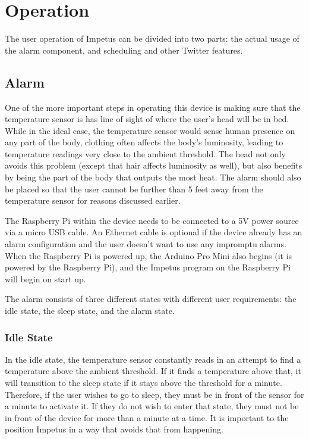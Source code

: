 \chapter{Operation}
The user operation of Impetus can be divided into two parts: the
actual usage of the alarm component, and scheduling and other Twitter
features.

\section{Alarm}
One of the more important steps in operating this device is making
sure that the temperature sensor is has line of sight of where the
user's head will be in bed. While in the ideal case, the temperature
sensor would sense human presence on any part of the body, clothing
often affects the body's luminosity, leading to temperature readings
very close to the ambient threshold. The head not only avoids this
problem (except that hair affects luminosity as well), but also
benefits by being the part of the body that outputs the most heat. The
alarm should also be placed so that the user cannot be further than 5
feet away from the temperature sensor for reasons discussed earlier.

The Raspberry Pi within the device needs to be connected to a 5V power
source via a micro USB cable. An Ethernet cable is optional if the
device already has an alarm configuration and the user doesn't want to
use any impromptu alarms. When the Raspberry Pi is powered up, the
Arduino Pro Mini also begins (it is powered by the Raspberry Pi), and
the Impetus program on the Raspberry Pi will begin on start up.

The alarm consists of three different states with different user
requirements: the idle state, the sleep state, and the alarm state.

\subsection{Idle State}
In the idle state, the temperature sensor constantly reads in an
attempt to find a temperature above the ambient threshold. If it finds
a temperature above that, it will transition to the sleep state if it
stays above the threshold for a minute. Therefore, if the user wishes
to go to sleep, they must be in front of the sensor for a minute to
activate it. If they do not wish to enter that state, they must not be
in front of the device for more than a minute at a time. It is
important to the position Impetus in a way that avoids that from
happening.


